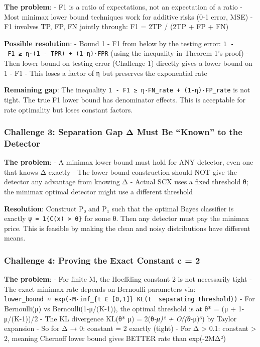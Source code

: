 \documentclass[
  12pt,
]{ctexart}
\begin{document}
\textbf{The problem}: - F1 is a ratio of expectations, not an
expectation of a ratio - Most minimax lower bound techniques work for
additive risks (0-1 error, MSE) - F1 involves TP, FP, FN jointly
through: F1 = 2TP / (2TP + FP + FN)

\textbf{Possible resolution}: - Bound 1 - F1 from below by the testing
error: \texttt{1\ -\ F1\ ≥\ η·(1\ -\ TPR)\ +\ (1-η)·FPR} (using the
inequality in Theorem 1's proof) - Then lower bound on testing error
(Challenge 1) directly gives a lower bound on 1 - F1 - This loses a
factor of η but preserves the exponential rate

\textbf{Remaining gap}: The inequality
\texttt{1\ -\ F1\ ≥\ η·FN\_rate\ +\ (1-η)·FP\_rate} is not tight. The
true F1 lower bound has denominator effects. This is acceptable for rate
optimality but loses constant factors.

\subsubsection{Challenge 3: Separation Gap Δ Must Be ``Known'' to the
Detector}\label{challenge-3-separation-gap-ux3b4-must-be-known-to-the-detector}

\textbf{The problem}: - A minimax lower bound must hold for ANY
detector, even one that knows Δ exactly - The lower bound construction
should NOT give the detector any advantage from knowing Δ - Actual SCX
uses a fixed threshold θ; the minimax optimal detector might use a
different threshold

\textbf{Resolution}: Construct P₀ and P₁ such that the optimal Bayes
classifier is exactly \texttt{ψ\ =\ 1\{C(x)\ \textgreater{}\ θ\}} for
some θ. Then any detector must pay the minimax price. This is feasible
by making the clean and noisy distributions have different means.

\subsubsection{Challenge 4: Proving the Exact Constant c =
2}\label{challenge-4-proving-the-exact-constant-c-2}

\textbf{The problem}: - For finite M, the Hoeffding constant 2 is not
necessarily tight - The exact minimax rate depends on Bernoulli
parameters via:
\texttt{lower\_bound\ ≈\ exp(-M·inf\_\{t\ ∈\ {[}0,1{]}\}\ KL(t\ \textbar{}\textbar{}\ separating\ threshold))}
- For Bernoulli(μ) vs Bernoulli(1-μ/(K-1)), the optimal threshold is at
θ* = (μ + 1-μ/(K-1))/2 - The KL divergence KL(θ* \textbar\textbar{} μ) =
2(θ\emph{-μ)² + O((θ}-μ)³) by Taylor expansion - So for Δ → 0: constant
= 2 exactly (tight) - For Δ \textgreater{} 0.1: constant \textgreater{}
2, meaning Chernoff lower bound gives BETTER rate than exp(-2MΔ²)
\end{document}
